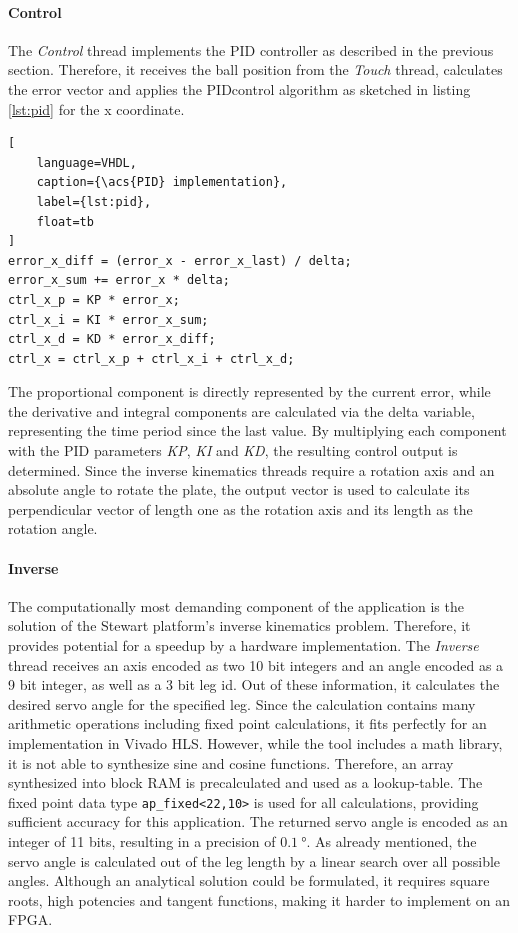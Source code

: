 \paragraph{Control} The \emph{Control} thread implements the \ac{PID}
controller as described in the previous section. Therefore, it receives the
ball position from the \emph{Touch} thread, calculates the error vector and
applies the \ac{PID}control algorithm as sketched in listing \ref{lst:pid} for
the x coordinate.
\begin{lstlisting}[
	language=VHDL,
	caption={\acs{PID} implementation},
	label={lst:pid},
	float=tb
]
error_x_diff = (error_x - error_x_last) / delta;
error_x_sum += error_x * delta;
ctrl_x_p = KP * error_x;
ctrl_x_i = KI * error_x_sum;
ctrl_x_d = KD * error_x_diff;
ctrl_x = ctrl_x_p + ctrl_x_i + ctrl_x_d;
\end{lstlisting}
The proportional component is directly represented by the current error, while
the derivative and integral components are calculated via the delta variable,
representing the time period since the last value. By multiplying each
component with the \ac{PID} parameters \emph{KP}, \emph{KI} and \emph{KD}, the
resulting control output is determined. Since the inverse kinematics threads
require a rotation axis and an absolute angle to rotate the plate, the output
vector is used to calculate its perpendicular vector of length one as the
rotation axis and its length as the rotation angle.

\paragraph{Inverse} The computationally most demanding component of the
application is the solution of the Stewart platform's inverse kinematics
problem. Therefore, it provides  potential for a speedup by a hardware
implementation. The \emph{Inverse} thread receives an axis encoded as two 10
bit integers and an angle encoded as a 9 bit integer, as well as a 3 bit leg
id. Out of these information, it calculates the desired servo angle for the
specified leg. Since the calculation contains many arithmetic operations
including fixed point calculations, it fits perfectly for an implementation in
Vivado HLS. However, while the tool includes a math library, it is not able to
synthesize sine and cosine functions. Therefore, an array synthesized into
block \ac{RAM} is precalculated and used as a lookup-table. The fixed point
data type \lstinline{ap_fixed<22,10>} is used for all calculations, providing
sufficient accuracy for this application. The returned servo angle is encoded
as an integer of 11 bits, resulting in a precision of $\SI{0.1}{\degree}$. As
already mentioned, the servo angle is calculated out of the leg length by a
linear search over all possible angles. Although an analytical solution could
be formulated, it requires square roots, high potencies and tangent functions,
making it harder to implement on an FPGA.

